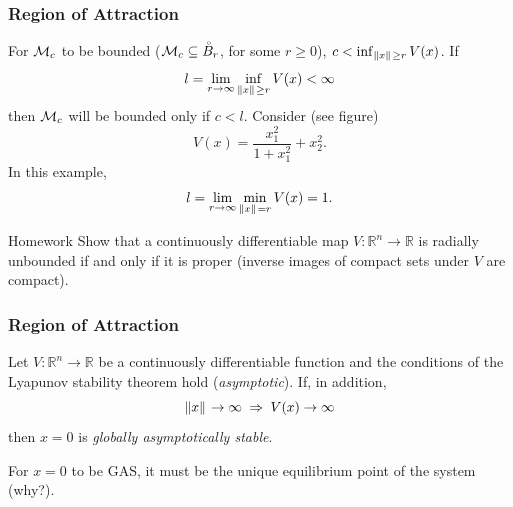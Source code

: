 \begin{frame}
    \frametitle{Region of Attraction}
    For $\mathcal{M}_c$ to be bounded ($\mathcal{M}_c \subseteq \accentset{\circ}{B}_r$,
    for some $r \geq 0$), $c < \inf_{\|{x}\|_{{}_{}} \geq r}V(x)$. If \[ l = \lim_{r
    \to \infty} \inf_{\|{x}\|_{{}_{}} \geq r} V(x) < \infty \] then $\mathcal{M}_c$ will be bounded only if $c < l$.
    Consider (see figure) \[ V(x) =
    \frac{x_1^2}{1 + x_1^2} + x_2^2. \] In this example, 
    \[ l = \lim_{r \to \infty} \min_{\|{x}\|_{{}_{}}=r} V(x) = 1. \] 

    \vspace{-5mm}
    \begin{block}{Homework}
        Show that a continuously differentiable map $V: \mathbb{R}^n \rightarrow
        \mathbb{R}$ is radially unbounded if and only if it is proper (inverse
        images of compact sets under $V$ are compact).
    \end{block}
\end{frame}

\begin{frame}
    \frametitle{Region of Attraction}

    \begin{theorem}
        Let $V: \mathbb{R}^n \rightarrow \mathbb{R}$ be a continuously
        differentiable function and the conditions of the Lyapunov stability
        theorem hold (\textit{asymptotic}). If, in addition, \[ \|{x}\|_{{}_{}} \to
        \infty \; \Rightarrow \; V(x) \to \infty \] then $x=0$ is
        \textit{globally asymptotically stable}.
    \end{theorem}
    
    \begin{rem}
        For $x=0$ to be GAS, it must be the unique equilibrium point of the
        system (why?).
    \end{rem}
\end{frame}


